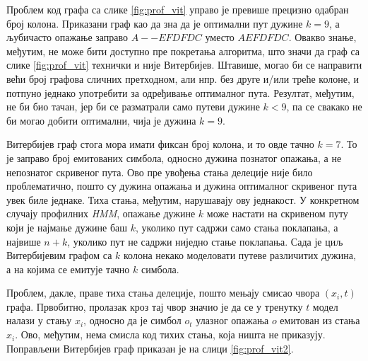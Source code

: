 \documentclass[12pt,oneside]{memoir}
\begin{document}
\begin{CJK}{UTF8}{ipxm}
Проблем код графа са слике \ref{fig:prof_vit} управо је превише прецизно одабран број колона. Приказани граф као да зна да је оптимални пут дужине $k = 9$, а љубичасто опажање заправо $A--EFDFDC$ уместо $AEFDFDC$. Овакво знање, међутим, не може бити доступно пре покретања алгоритма, што значи да граф са слике \ref{fig:prof_vit} технички и није Витербијев. Штавише, могао би се направити већи број графова сличних претходном, али нпр. без друге и/или треће колоне, и потпуно једнако употребити за одређивање оптималног пута. Резултат, међутим, не би био тачан, јер би се разматрали само путеви дужине $k < 9$, па се свакако не би могао добити оптимални, чија је дужина $k = 9$.

Витербијев граф стога мора имати фиксан број колона, и то овде тачно $k = 7$. То је заправо број емитованих симбола, односно дужина познатог опажања, а не непознатог скривеног пута. Ово пре увођења стања делеције није било проблематично, пошто су дужина опажања и дужина оптималног скривеног пута увек биле једнаке. Тиха стања, међутим, нарушавају ову једнакост. У конкретном случају профилних \textit{HMM}, опажање дужине $k$ може настати на скривеном путу који је најмање дужине баш $k$, уколико пут садржи само стања поклапања, а највише $n+k$, уколико пут не садржи ниједно стање поклапања. Сада је циљ Витербијевим графом са $k$ колона некако моделовати путеве различитих дужина, а на којима се емитује тачно $k$ симбола.

Проблем, дакле, праве тиха стања делеције, пошто мењају смисао чвора $(x_i, t)$ графа. Првобитно, пролазак кроз тај чвор значио је да се у тренутку $t$ модел налази у стању $x_i$, односно да је симбол $o_t$ улазног опажања $o$ емитован из стања $x_i$. Ово, међутим, нема смисла код тихих стања, која ништа не приказују. Поправљени Витербијев граф приказан је на слици \ref{fig:prof_vit2}.


\end{CJK}
\end{document}
